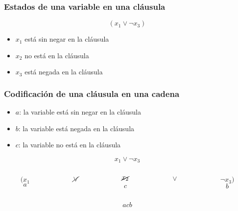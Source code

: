 \documentclass{beamer}
\begin{document}
\begin{frame}

    \frametitle{Estados de una variable en una cláusula}

    \begin{Large}
        $$(x_1\vee  \neg x_3)$$
    \end{Large}

    \pause
    \vspace{1cm}
    \begin{itemize}
        \item<1-> $x_1$ está sin negar en la cláusula
        \item<3-> $x_2$ no está en la cláusula
        \item<2-> $x_3$ está negada en la cláusula
    \end{itemize}
\end{frame}

\begin{frame}
    \frametitle{Codificación de una cláusula en una cadena}

    \begin{itemize}
        \item $a$: la variable está sin negar en la cláusula
              \pause
        \item $b$: la variable está negada en la cláusula
              \pause
        \item $c$: la variable no está en la cláusula
    \end{itemize}

    \pause


    \begin{Large}
        $$x_1\vee \neg x_3$$

        \pause

        \begin{columns}
            \begin{column}{1cm}
                $$({x_1}$$$$a$$
            \end{column}
            \pause
            \begin{column}{1cm}
                $$\cancel{\vee}$$$$\ $$
            \end{column}
            \begin{column}{1cm}
                $$\cancel{x_2}$$$$c$$
            \end{column}
            \pause
            \begin{column}{1cm}
                $$\vee$$$$\ $$
            \end{column}
            \begin{column}{1cm}
                $$\neg{x_3})$$$$b$$
            \end{column}
        \end{columns}

        \pause

        $$acb$$
    \end{Large}


\end{frame}
\end{document}
